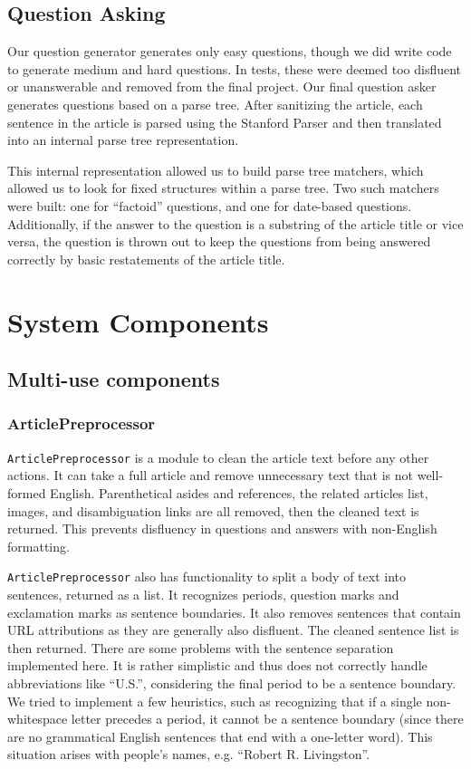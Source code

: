 \documentclass[11pt]{article}
\begin{document}
\subsection{Question Asking}

Our question generator generates only easy questions, though we did write code
to generate medium and hard questions. In tests, these were deemed too disfluent
or unanswerable and removed from the final project. Our final question asker
generates questions based on a parse tree. After sanitizing the article, each
sentence in the article is parsed using the Stanford Parser and then translated
into an internal parse tree representation.

This internal representation allowed us to build parse tree matchers, which
allowed us to look for fixed structures within a parse tree. Two such matchers
were built: one for ``factoid'' questions, and one for date-based questions.
Additionally, if the answer to the question is a substring of the article title
or vice versa, the question is thrown out to keep the questions from being
answered correctly by basic restatements of the article title.

\section{System Components}

\subsection{Multi-use components}
\subsubsection{ArticlePreprocessor}

\texttt{ArticlePreprocessor} is a module to clean the article text before any
other actions. It can take a full article and remove unnecessary text that is
not well-formed English. Parenthetical asides and references, the related
articles list, images, and disambiguation links are all removed, then the
cleaned text is returned. This prevents disfluency in questions and answers with
non-English formatting.

\texttt{ArticlePreprocessor} also has functionality to split a body of text into
sentences, returned as a list. It recognizes periods, question marks and
exclamation marks as sentence boundaries. It also removes sentences that contain
URL attributions as they are generally also disfluent. The cleaned sentence list
is then returned. There are some problems with the sentence separation
implemented here. It is rather simplistic and thus does not correctly handle
abbreviations like ``U.S.'', considering the final period to be a sentence
boundary. We tried to implement a few heuristics, such as recognizing that if a
single non-whitespace letter precedes a period, it cannot be a sentence boundary
(since there are no grammatical English sentences that end with a one-letter
word). This situation arises with people's names, e.g. ``Robert R. Livingston''.
\end{document}
